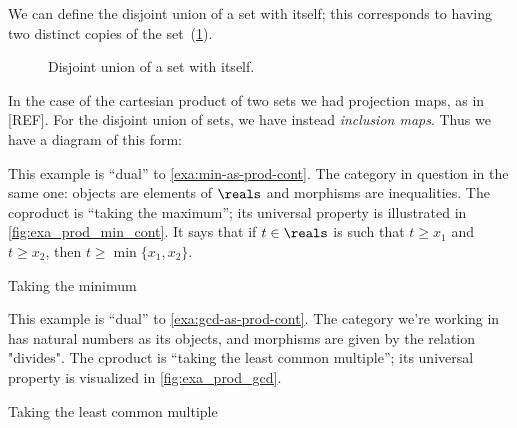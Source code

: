 We can define the disjoint union of a set with itself; this corresponds to having two distinct copies of the set~(\cref{fig:disjointself}).

\begin{figure}[h!]
  \begin{center}
    \caption{Disjoint union of a set with itself.}
    \label{fig:disjointself}
  \end{center}
\end{figure}

In the case of the cartesian product of two sets we had projection maps, as in [REF]. For the disjoint union of sets, we have instead \emph{inclusion maps}. Thus we have a diagram of this form:


  \begin{figure}[h!]
  \begin{center}
  \end{center}
    \label{fig:coprod_disunion_diagram}
  \end{figure}


\begin{example}\label{exa:min-as-prod-cont-to-rename}
This example is ``dual'' to \cref{exa:min-as-prod-cont}. The category in question in the same one: objects are elements of $\reals$ and morphisms are inequalities. The coproduct is ``taking the maximum''; its universal property is illustrated in \cref{fig:exa_prod_min_cont}. It says that if $t \in \reals$ is such that $t \geq x_1$ and $t \geq x_2$, then $t \geq \min \{ x_1, x_2 \}$.
  \begin{marginfigure}
  \begin{center}
  \end{center}
    \caption{Taking the minimum}
    \label{fig:exa_coprod_max_cont}
  \end{marginfigure}
\end{example}

\begin{example}\label{exa:lcm-as-coprod-cont}
This example is ``dual'' to \cref{exa:gcd-as-prod-cont}. The category we're working in has natural numbers as its objects, and morphisms are given by the relation "divides". The cproduct is ``taking the least common multiple''; its universal property is visualized in \cref{fig:exa_prod_gcd}.
  \begin{marginfigure}
  \begin{center}
  \end{center}
    \caption{Taking the least common multiple}
    \label{fig:exa_coprod_lcm_cont}
  \end{marginfigure}
\end{example}

